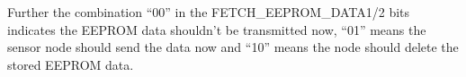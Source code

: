 \documentclass[12pt,a4paper,titlepage,oneside]{article}
\begin{document}
Further the combination ``00'' in the FETCH\_EEPROM\_DATA1/2 bits indicates the EEPROM data shouldn't be transmitted now, ``01'' means the sensor node should send the data now and ``10'' means the node should delete the stored EEPROM data.




\clearpage 
{}
{}


\printindex
\printindex
\end{document}
